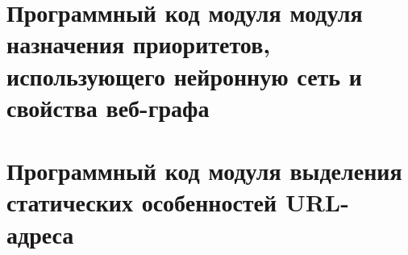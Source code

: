 \section{Программный код модуля модуля назначения приоритетов, использующего нейронную сеть и свойства веб-графа}
\label{code_2}


\section{Программный код модуля выделения статических особенностей URL-адреса}
\label{code_3}
